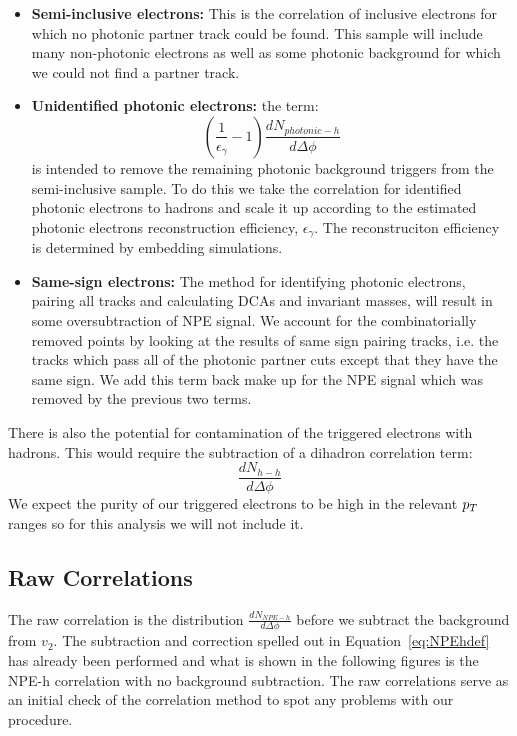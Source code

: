 \begin{itemize}
\item \textbf{Semi-inclusive electrons:} This is the correlation of inclusive electrons for which no photonic partner track could be found. This sample will include many non-photonic electrons as well as some photonic background for which we could not find a partner track. 
\item \textbf{Unidentified photonic electrons:} the term: \[ \left(\frac{1}{\epsilon_{\gamma}} - 1\right)\frac{dN_{photonic-h}}{d\Delta\phi} \] is intended to remove the remaining photonic background triggers from the semi-inclusive sample. To do this we take the correlation for identified photonic electrons to hadrons and scale it up according to the estimated photonic electrons reconstruction efficiency, $\epsilon_{\gamma}$. The reconstruciton efficiency is determined by embedding simulations.  
\item \textbf{Same-sign electrons:} The method for identifying photonic electrons, pairing all tracks and calculating DCAs and invariant masses, will result in some oversubtraction of NPE signal. We account for the combinatorially removed points by looking at the results of same sign pairing tracks, i.e. the tracks which pass all of the photonic partner cuts except that they have the same sign. We add this term back make up for the NPE signal which was removed by the previous two terms. 
\end{itemize}

There is also the potential for contamination of the triggered electrons with hadrons. This would require the subtraction of a dihadron correlation term: \[\frac{dN_{h-h}}{d\Delta\phi}\] We expect the purity of our triggered electrons to be high in the relevant $p_{T}$ ranges so for this analysis we will not include it. 

\subsection{Raw Correlations}

The raw correlation is the distribution $\frac{dN_{NPE-h}}{d\Delta\phi}$ before we subtract the background from $v_2$. The subtraction and correction spelled out in Equation~\ref{eq:NPEhdef} has already been performed and what is shown in the following figures is the NPE-h correlation with no background subtraction. The raw correlations serve as an initial check of the correlation method to spot any problems with our procedure. 


